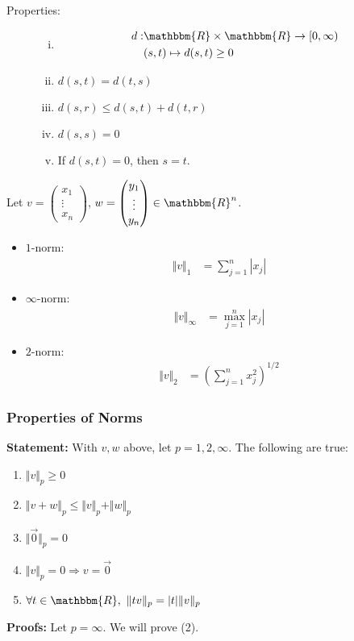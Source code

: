 \documentclass[10pt]{extarticle}
\newcommand{\R}{\mathbbm{R}}
\begin{document}
    \begin{description}
      \item[Properties:]\hfill
        \begin{enumerate}[(i)]
          \item 
          \begin{align*}
            d: &\R \times \R \rightarrow [0,\infty)\\
               &(s,t) \mapsto d(s,t) \geq 0
          \end{align*}
          \item $d(s,t) = d(t,s)$
          \item $d(s,r) \leq d(s,t) + d(t,r)$
          \item $d(s,s) = 0$
          \item If $d(s,t) = 0$, then $s = t$.
        \end{enumerate}
    \end{description}
    Let $v = \begin{pmatrix}x_1\\\vdots\\x_n\end{pmatrix}$, $ w = \begin{pmatrix}y_1\\\vdots\\y_n\end{pmatrix} \in \R^n$.
    \begin{itemize}
      \item  $1$-norm:
        \begin{align*}
          \Vert v \Vert_1 &= \sum_{j = 1}^{n} |x_j|
        \end{align*}
      \item $\infty$-norm:
        \begin{align*}
          \Vert v \Vert_{\infty} &= \max_{j=1}^{n} |x_j|
        \end{align*}
      \item $2$-norm:
        \begin{align*}
          \Vert v \Vert_2 &= \left(\sum_{j = 1}^{n} x_j^2\right)^{1/2}
        \end{align*}
    \end{itemize}
    \subsubsection{Properties of Norms}%
    \textbf{Statement:} With $v,w$  above, let $p = 1,2,\infty$. The following are true:
        \begin{enumerate}[(1)]
          \item $\Vert v\Vert_p \geq 0$
          \item $\Vert v+w \Vert_p \leq \Vert v\Vert_p + \Vert w \Vert_p$
          \item $\Vert \vec{0}\Vert_p = 0$
          \item $\Vert v\Vert_p = 0 \Rightarrow v = \vec{0}$
          \item $\forall t\in \R,~\Vert tv \Vert_{p} = |t| \Vert v \Vert_p$ 
        \end{enumerate}
    \textbf{Proofs:} Let $p = \infty$. We will prove (2).\\
\end{document}
